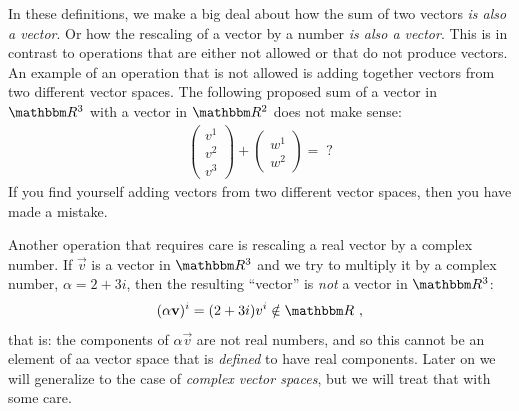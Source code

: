 \documentclass[12pt, oneside]{report}    %
\begin{document}
In these definitions, we make a big deal about how the sum of two vectors \emph{is also a vector}. Or how the rescaling of a vector by a number \emph{is also a vector}. This is in contrast to operations that are either not allowed or that do not produce vectors. An example of an operation that is not allowed is adding together vectors from two different vector spaces. The following proposed sum of a vector in $\RR ^3$ with  a vector in $\RR ^2$ does not make sense:
\begin{align}
    \begin{pmatrix}
        v^1\\ v^2 \\v^3
    \end{pmatrix}
    +
    \begin{pmatrix}
        w^1\\ w^2 
    \end{pmatrix}
    =
    \; ?
\end{align}
If you find yourself adding vectors from two different vector spaces, then you have made a mistake.

Another operation that requires care is rescaling a real vector by a complex number. If $\vec{v}$ is a vector in $\RR ^3$ and we try to multiply it by a complex number, $\alpha = 2+3i$, then the resulting ``vector'' is \emph{not} a vector in $\RR^3$:
\begin{align}
    (\alpha\vec{v})^i = (2+3i)v^i \notin \RR  \ ,
\end{align}
that is: the components of $\alpha\vec{v}$ are not real numbers, and so this cannot be an element of aa vector space that is \emph{defined} to have real components. Later on we will generalize to the case of \emph{complex vector spaces}, but we will treat that with some care.
\end{document}
